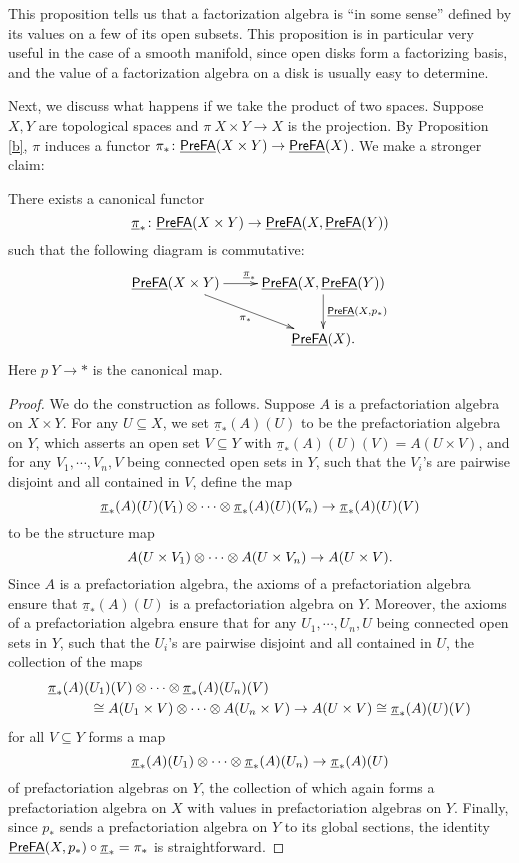 \documentclass[twoside]{article}
\begin{document}
This proposition tells us that a factorization algebra is ``in some sense''
defined by its values on a few of its open subsets. This proposition is
in particular very useful in the case of a smooth manifold, 
since open disks form a factorizing basis, and the value of 
a factorization algebra on a disk is usually easy to determine.

Next, we discuss what happens if we take the product of two spaces. Suppose $X,Y$
are topological spaces and $\pi\:X\times Y\to X$ is the projection. 
By Proposition \ref{b}, $\pi$ induces a functor $\pi_*\colon\underline{\smash{\mathsf{PreFA}}}(X\times Y)
\to\underline{\smash{\mathsf{PreFA}}}(X)$. We make a stronger claim:

\begin{proposition}
    There exists a canonical functor \[\underline\pi_*\colon\underline{\smash{\mathsf{PreFA}}}(X\times Y)\to\underline{\smash{\mathsf{PreFA}}}(X,\underline{\smash{\mathsf{PreFA}}}(Y))\]
    such that the following diagram is commutative:
    \[\xymatrix{
        \PreFA(X\times Y)\ar[r]^{\underline\pi_*}\ar[rd]_{\pi_*}
        &\PreFA(X,\PreFA(Y))\ar[d]^{\PreFA(X,p_*)}
        \\&\PreFA(X).
    }\]
    Here $p\:Y\to*$ is the canonical map.
\end{proposition}

\begin{proof}
    We do the construction as follows. Suppose $A$ is a prefactoriation algebra on 
    $X\times Y$. For any $U\subseteq X$, we set $\underline\pi_*(A)(U)$ to be
    the prefactoriation algebra on $Y$, which asserts an open set $V\subseteq Y$
    with $\underline\pi_*(A)(U)(V)=A(U\times V)$, and for any $V_1,\cdots,V_n,V$
    being connected open sets in $Y$, such that the $V_i$'s are pairwise disjoint
    and all contained in $V$, define the map \[\underline\pi_*(A)(U)(V_1)\otimes\cdots
    \otimes\underline\pi_*(A)(U)(V_n)\to\underline\pi_*(A)(U)(V)\] to be the structure
    map \[A(U\times V_1)\otimes\cdots\otimes A(U\times V_n)\to A(U\times V).\] Since 
    $A$ is a prefactoriation algebra, the axioms of a prefactoriation algebra
    ensure that $\underline\pi_*(A)(U)$ is a prefactoriation algebra on $Y$. 
    Moreover, the axioms of a prefactoriation algebra ensure that for any
    $U_1,\cdots,U_n,U$ being connected open sets in $Y$, such that the $U_i$'s are
    pairwise disjoint and all contained in $U$, the collection of the maps
    \[\begin{aligned}&\underline\pi_*(A)(U_1)(V)\otimes\cdots\otimes\underline\pi_*(A)(U_n)(V)
    \\&\hspace{3em}\cong A(U_1\times V)\otimes\cdots\otimes A(U_n\times V)\to A(U\times V)\cong
    \underline\pi_*(A)(U)(V)\end{aligned}\] for all $V\subseteq Y$ forms a map
    \[\underline\pi_*(A)(U_1)\otimes\cdots\otimes\underline\pi_*(A)(U_n)
    \to\underline\pi_*(A)(U)\] of prefactoriation algebras on $Y$, the collection
    of which again forms a prefactoriation algebra on $X$ with values in 
    prefactoriation algebras on $Y$. Finally, since $p_*$ sends a prefactoriation
    algebra on $Y$ to its global sections, the identity $\underline{\smash{\mathsf{PreFA}}}(X,p_*)
    \circ\underline\pi_*=\pi_*$ is straightforward.
\end{proof}
\end{document}
